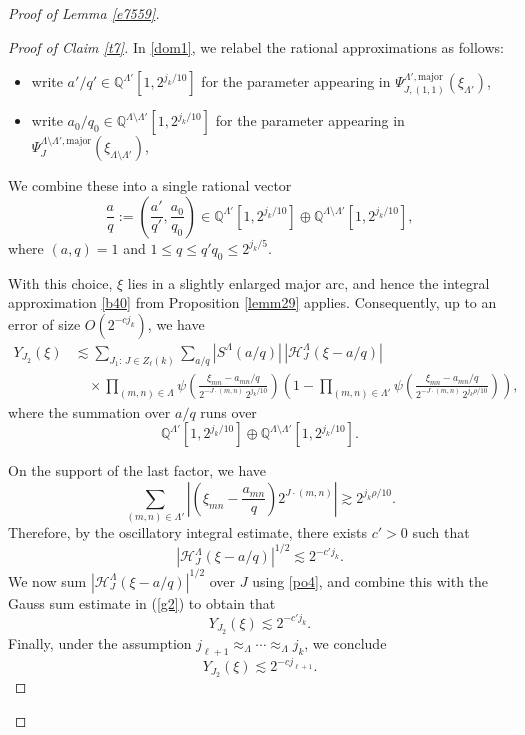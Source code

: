 \documentclass[11 pt,letterpaper]{amsart}
\theoremstyle{plain}
\theoremstyle{definition}
\theoremstyle{remark} \theoremstyle{exam} \theoremstyle{ob}
\numberwithin{equation}{section}
\begin{document}
\begin{proof}[Proof of Lemma \ref{e7559}]
 
\begin{proof}[Proof of Claim \ref{t7}]
In \eqref{dom1}, we relabel the rational approximations as follows:
\begin{itemize}
\item write $a'/q' \in \mathbb{Q}^{\Lambda'}[1,2^{j_k/10}]$ 
for the parameter appearing in 
$\Psi_{J,(1,1)}^{\Lambda',\mathrm{major}}(\xi_{\Lambda'})$,
\item write $a_0/q_0 \in \mathbb{Q}^{\Lambda\setminus\Lambda'}[1,2^{j_k/10}]$ 
for the parameter appearing in 
$\Psi_J^{\Lambda\setminus\Lambda',\mathrm{major}}(\xi_{\Lambda\setminus\Lambda'})$,
\end{itemize}
We combine these into a single rational vector
\[
\frac{a}{q}
:= \left(\frac{a'}{q'},\frac{a_0}{q_0}\right)
\in 
\mathbb{Q}^{\Lambda'}[1,2^{j_k/10}]\oplus\mathbb{Q}^{\Lambda\setminus\Lambda'}[1,2^{j_k/10}],
\]
where $(a,q)=1$ and $1\le q\le q'q_0\le 2^{j_k/5}$.

With this choice, $\xi$ lies in a slightly enlarged major arc, and hence
the integral approximation \eqref{b40} from Proposition \ref{lemm29}
applies. Consequently, up to an error of size $O(2^{-c j_k})$, we have
\begin{align*}
Y_{J_2}(\xi)
&\lesssim 
\sum_{J_1:\,J\in Z_\ell(k)}
\sum_{a/q}
|S^{\Lambda}(a/q)|
\,|\mathcal{H}^{\Lambda}_J(\xi-a/q)| \\
&\quad\times
\prod_{(m,n)\in \Lambda}
\psi\!\left(
\frac{\xi_{mn}-a_{mn}/q}{2^{-J\cdot(m,n)}\,2^{j_k/10}}
\right)
\left(1-
\prod_{(m,n)\in \Lambda'}
\psi\!\left(
\frac{\xi_{mn}-a_{mn}/q}{2^{-J\cdot(m,n)}\,2^{j_k\rho/10}}
\right)
\right),
\end{align*}
where the summation over $a/q$ runs over
\[
\mathbb{Q}^{\Lambda'}[1,2^{j_k/10}]\oplus\mathbb{Q}^{\Lambda\setminus\Lambda'}[1,2^{j_k/10}].
\]

On the support of the last factor, we have
\[
\sum_{(m,n)\in \Lambda'}
\left|
\left(\xi_{mn}-\frac{a_{mn}}{q}\right)
2^{J\cdot(m,n)}
\right|
\gtrsim 2^{j_k\rho/10}.
\]
Therefore, by the    oscillatory integral estimate, there exists $c'>0$ such that
\[
|\mathcal{H}^{\Lambda}_J(\xi-a/q)|^{1/2}
\lesssim 2^{-c'j_k}.
\]
We now sum   $|\mathcal{H}^{\Lambda}_J(\xi-a/q)|^{1/2}$ over $J$ using \eqref{po4}, and combine this with the Gauss sum estimate in (\ref{g2}) to obtain that
\[
Y_{J_2}(\xi)\lesssim 2^{-c' j_k}.
\]
Finally, under the assumption $j_{\ell+1}\approx_{\Lambda}\cdots\approx_{\Lambda} j_k$,
we conclude
\[
Y_{J_2}(\xi)\lesssim 2^{-c j_{\ell+1}}.
\]
\end{proof}


\end{proof}
\end{document}
